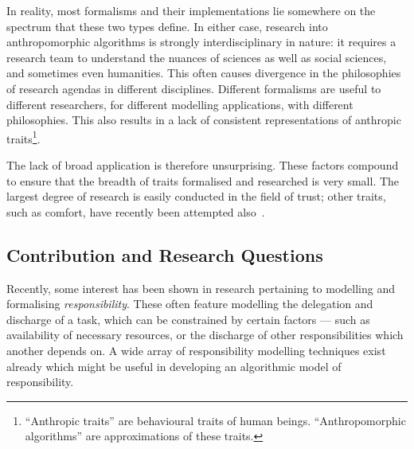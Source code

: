 In reality, most formalisms and their implementations lie somewhere on the spectrum that these two types define. In either case, research into anthropomorphic algorithms is strongly interdisciplinary in nature: it requires a research team to understand the nuances of sciences as well as social sciences, and sometimes even humanities. This often causes divergence in the philosophies of research agendas in different disciplines. Different formalisms are useful to different researchers, for different modelling applications, with different philosophies. This also results in a lack of consistent representations of anthropic traits\footnote{``Anthropic traits'' are behavioural traits of human beings. ``Anthropomorphic algorithms'' are approximations of these traits.}.

The lack of broad application is therefore unsurprising. These factors compound to ensure that the breadth of traits formalised and researched is very small. The largest degree of research is easily conducted in the field of trust; other traits, such as comfort, have recently been attempted also~\cite{marsh2011defining}.\par

\subsection{Contribution and Research Questions}

Recently, some interest has been shown in research pertaining to modelling and formalising \emph{responsibility}\cite{berreby2015modelling,sommerville_dependable_systems_chap_8,Simpson2011}. These often feature modelling the delegation and discharge of a task, which can be constrained by certain factors --- such as availability of necessary resources, or the discharge of other responsibilities which another depends on. A wide array of responsibility modelling techniques exist already which might be useful in developing an algorithmic model of responsibility.\par


